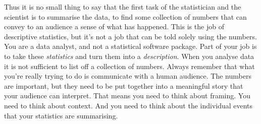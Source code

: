 \documentclass[
]{book}
\begin{document}
Thus it is no small thing to say that the first task of the statistician and the scientist is to summarise the data, to find some collection of numbers that can convey to an audience a sense of what has happened. This is the job of descriptive statistics, but it's not a job that can be told solely using the numbers. You are a data analyst, and not a statistical software package. Part of your job is to take these \emph{statistics} and turn them into a \emph{description}. When you analyse data it is not sufficient to list off a collection of numbers. Always remember that what you're really trying to do is communicate with a human audience. The numbers are important, but they need to be put together into a meaningful story that your audience can interpret. That means you need to think about framing. You need to think about context. And you need to think about the individual events that your statistics are summarising.

  
\end{document}
